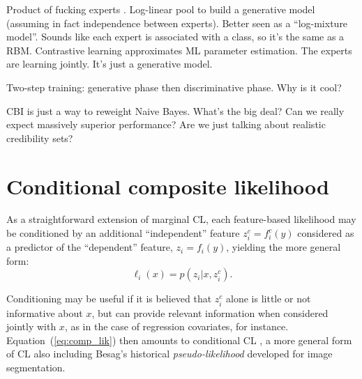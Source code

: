 \documentclass[english]{scrartcl}
\begin{document}



{\color{red}Product of fucking experts \cite{Hinton-02}. Log-linear pool to build a generative model (assuming in fact independence between experts). Better seen as a ``log-mixture model''. Sounds like each expert is associated with a class, so it's the same as a RBM. Contrastive learning approximates ML parameter estimation. The experts are learning jointly. It's just a generative model.}

{\color{red}Two-step training: generative phase then discriminative phase. Why is it cool?}

{\color{red}CBI is just a way to reweight Naive Bayes. What's the big deal? Can we really expect massively superior performance? Are we just talking about realistic credibility sets?}


\appendix

\section{Conditional composite likelihood}
\label{sec:conditional}

As a straightforward  extension of marginal CL, each feature-based likelihood may be conditioned by an additional ``independent'' feature $z^c_i = f^c_i(y)$ considered as a predictor of the ``dependent'' feature, $z_i=f_i(y)$, yielding the more general form:
\begin{equation}
\label{eq:cond_feat_lik}
\ell_i(x) = p(z_i|x,z^c_i).
\end{equation}

Conditioning may be useful if it is believed that $z^c_i$ alone is little or not informative about $x$, but can provide relevant information when considered jointly with $x$, as in the case of regression covariates, for instance. Equation~(\ref{eq:comp_lik}) then amounts to conditional CL \cite{Varin-11}, a more general form of CL also including Besag's historical {\em pseudo-likelihood} \cite{Besag-74} developed for image segmentation.
\end{document}
